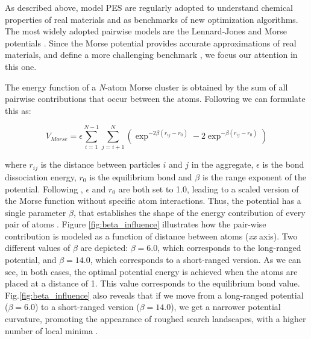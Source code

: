 	As described above, model PES are regularly adopted to understand chemical properties of real materials and as benchmarks of new optimization algorithms. The most widely adopted pairwise models are the Lennard-Jones \cite{lennardJones31} and Morse potentials \cite{morse29}. Since the Morse potential provides accurate approximations of real materials, and define a more challenging benchmark \cite{braier90, smirnov99}, we focus our attention in this one.

	The energy function of a \emph{N}-atom Morse cluster is obtained by the sum of all pairwise contributions that occur between the atoms. Following \cite{doye97, morse29} we can formulate this as:
	
	\begin{equation} 
		\label{eq:morse_potential}
		V_{Morse} = \epsilon \sum_{i=1}^{N-1}\sum_{j=i+1}^{N} \left ( \exp^{-2\beta(r_{ij}-r_{0})} - 2\exp^{-\beta(r_{ij}-r_{0})} \right)
	\end{equation}


	\noindent where $r_{ij}$ is the distance between particles $i$ and $j$ in the aggregate, $\epsilon$ is the bond dissociation energy, $r_{0}$ is the equilibrium bond and $\beta$ is the range exponent of the potential. Following \cite{doye97}, $\epsilon$ and $r_{0}$ are both set to 1.0, leading to a scaled version of the Morse function without specific atom interactions. Thus, the potential has a single parameter $\beta$, that establishes the shape of the energy contribution of every pair of atoms \cite{doye04}. Figure \ref{fig:beta_influence} illustrates how the pair-wise contribution is modeled as a function of distance between atoms (\emph{xx} axis). Two different values of $\beta$ are depicted: $\beta = 6.0$, which corresponds to the long-ranged potential, and $\beta = 14.0$, which corresponds to a short-ranged version. As we can see, in both cases, the optimal potential energy is achieved when the atoms are placed at a distance of 1. This value corresponds to the equilibrium bond value. Fig.\ref{fig:beta_influence} also reveals that if we move from a long-ranged potential ($\beta = 6.0$) to a short-ranged version ($\beta = 14.0$), we get a narrower potential curvature, promoting the appearance of roughed search landscapes, with a higher number of local minima \cite{doye04}.
	
	
	
	
	
	
	
	
	
